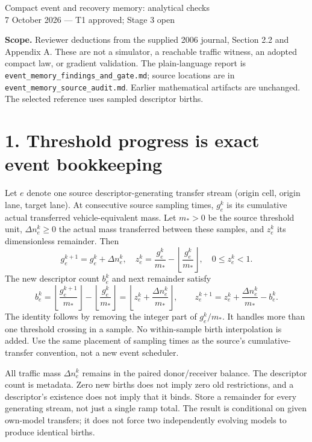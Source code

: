 \documentclass[11pt,a4paper]{article}
\begin{document}
{\Large Compact event and recovery memory: analytical checks}\\[4pt]
7 October 2026 --- T1 approved; Stage 3 open

\textbf{Scope.} Reviewer deductions from the supplied 2006 journal,
Section 2.2 and Appendix A. These are not a simulator, a reachable traffic
witness, an adopted compact law, or gradient validation. The plain-language
report is \texttt{event\_memory\_findings\_and\_gate.md}; source locations are
in \texttt{event\_memory\_source\_audit.md}. Earlier mathematical artifacts
are unchanged. The selected reference uses sampled descriptor births.

\section*{1. Threshold progress is exact event bookkeeping}
Let $e$ denote one source descriptor-generating transfer stream (origin cell,
origin lane, target lane). At consecutive source sampling times, $g_e^k$ is
its cumulative actual transferred vehicle-equivalent mass. Let $m_*>0$ be
the source threshold unit, $\Delta n_e^k\ge0$ the actual mass transferred
between these samples, and $z_e^k$ its dimensionless remainder. Then
\begin{equation}
 g_e^{k+1}=g_e^k+\Delta n_e^k,\quad
 z_e^k=\frac{g_e^k}{m_*}-\left\lfloor\frac{g_e^k}{m_*}\right\rfloor,
 \quad 0\le z_e^k<1.
\end{equation}
The new descriptor count $b_e^k$ and next remainder satisfy
\begin{equation}
 b_e^k=\left\lfloor\frac{g_e^{k+1}}{m_*}\right\rfloor-
 \left\lfloor\frac{g_e^k}{m_*}\right\rfloor
 =\left\lfloor z_e^k+\frac{\Delta n_e^k}{m_*}\right\rfloor,
 \qquad z_e^{k+1}=z_e^k+\frac{\Delta n_e^k}{m_*}-b_e^k.
\end{equation}
The identity follows by removing the integer part of $g_e^k/m_*$.
It handles more than one threshold crossing in a sample. No within-sample
birth interpolation is added. Use the same placement of sampling times as
the source's cumulative-transfer convention, not a new event scheduler.

All traffic mass $\Delta n_e^k$ remains in the paired donor/receiver balance.
The descriptor count is metadata. Zero new births does not imply zero old
restrictions, and a descriptor's existence does not imply that it binds.
Store a remainder for every generating stream, not just a single ramp total.
The result is conditional on given own-model transfers; it does not force
two independently evolving models to produce identical births.
\end{document}
